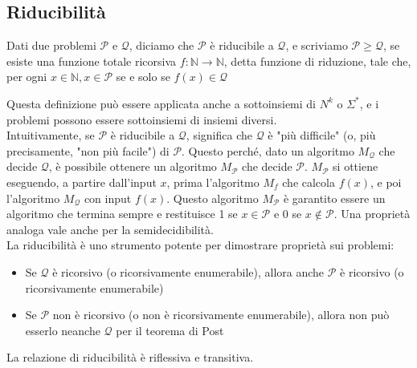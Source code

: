 \documentclass[12pt, a4paper]{report}
\begin{document}
                    \subsection{Riducibilità}
                        \begin{definitionbox}{}{}
                            Dati due problemi $\mathcal{P}$ e $\mathcal{Q}$, diciamo che $\mathcal{P}$ è riducibile a $\mathcal{Q}$, e scriviamo $\mathcal{P}\geq \mathcal{Q}$, se esiste una funzione totale ricorsiva $f:\mathbb{N}\to\mathbb{N}$, detta funzione di riduzione, tale che, per ogni $x\in\mathbb{N},x\in\mathcal{P}$ se e solo se $f(x)\in\mathcal{Q}$
                        \end{definitionbox}
                        Questa definizione può essere applicata anche a sottoinsiemi di $N^k$ o $\Sigma^*$, e i problemi possono essere sottoinsiemi di insiemi diversi.\\
                        Intuitivamente, se $\mathcal{P}$ è riducibile a $\mathcal{Q}$, significa che $\mathcal{Q}$ è "più difficile" (o, più precisamente, "non più facile") di $\mathcal{P}$. Questo perché, dato un algoritmo $M_\mathcal{Q}$ che decide $\mathcal{Q}$, è possibile ottenere un algoritmo $M_\mathcal{P}$ che decide $\mathcal{P}$. $M_\mathcal{P}$ si ottiene eseguendo, a partire dall'input $x$, prima l'algoritmo $M_f$ che calcola $f(x)$, e poi l'algoritmo $M_\mathcal{Q}$ con input $f(x)$. Questo algoritmo $M_\mathcal{P}$ è garantito essere un algoritmo che termina sempre e restituisce 1 se $x \in \mathcal{P}$ e 0 se $x \notin \mathcal{P}$. Una proprietà analoga vale anche per la semidecidibilità.\\
                        La riducibilità è uno strumento potente per dimostrare proprietà sui problemi: \begin{itemize}
                            \item Se $\mathcal{Q}$ è ricorsivo (o ricorsivamente enumerabile), allora anche $\mathcal{P}$ è ricorsivo (o ricorsivamente enumerabile)
                            \item Se $\mathcal{P}$ non è ricorsivo (o non è ricorsivamente enumerabile), allora non può esserlo neanche $\mathcal{Q}$ per il teorema di Post
                        \end{itemize}
                        La relazione di riducibilità è riflessiva e transitiva.
\end{document}
